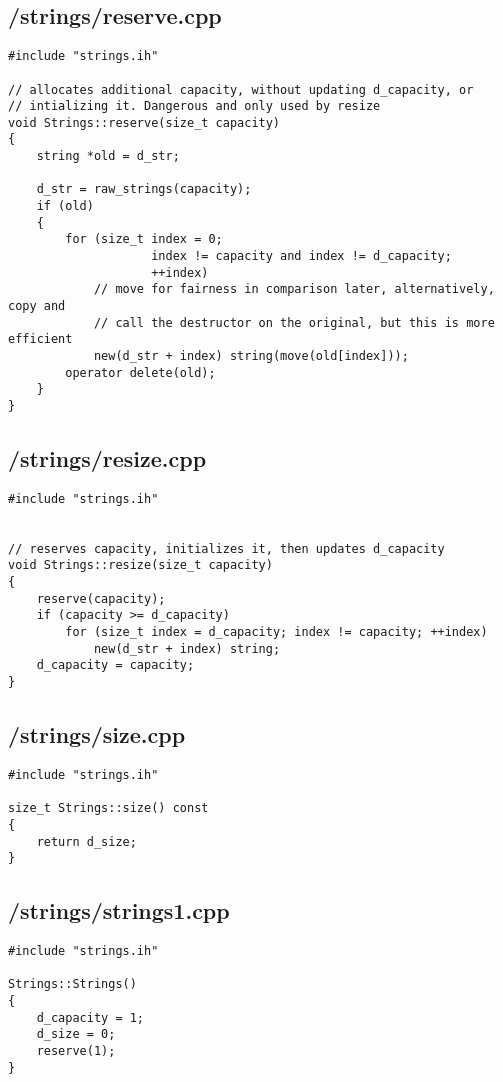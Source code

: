 \documentclass{article}
\begin{document}
\subsection*{/strings/reserve.cpp}
\begin{verbatim}
#include "strings.ih"

// allocates additional capacity, without updating d_capacity, or
// intializing it. Dangerous and only used by resize
void Strings::reserve(size_t capacity)
{
    string *old = d_str;

    d_str = raw_strings(capacity);
    if (old)
    {
        for (size_t index = 0; 
                    index != capacity and index != d_capacity; 
                    ++index)
            // move for fairness in comparison later, alternatively, copy and 
            // call the destructor on the original, but this is more efficient
            new(d_str + index) string(move(old[index]));
        operator delete(old);
    }
}

\end{verbatim}
\subsection*{/strings/resize.cpp}
\begin{verbatim}
#include "strings.ih"


// reserves capacity, initializes it, then updates d_capacity
void Strings::resize(size_t capacity)
{
    reserve(capacity);
    if (capacity >= d_capacity)
        for (size_t index = d_capacity; index != capacity; ++index)
            new(d_str + index) string;
    d_capacity = capacity;  
}
\end{verbatim}
\subsection*{/strings/size.cpp}
\begin{verbatim}
#include "strings.ih"

size_t Strings::size() const
{
    return d_size;   
}
\end{verbatim}
\subsection*{/strings/strings1.cpp}
\begin{verbatim}
#include "strings.ih"

Strings::Strings()
{
    d_capacity = 1;
    d_size = 0;
    reserve(1);
}

\end{verbatim}
\end{document}
